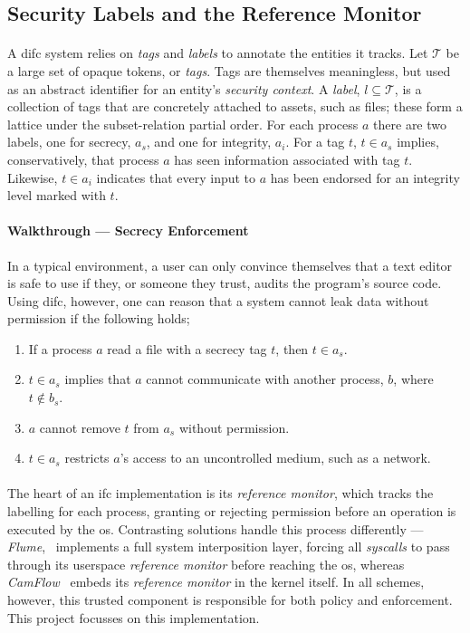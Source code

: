 \subsection{Security Labels and the Reference Monitor}

\paragraph{} A \acrshort{difc} system relies on \textit{tags} and \textit{labels} to annotate the entities it tracks. Let $\mathcal{T}$ be a large set of opaque tokens, or \textit{tags}. Tags are themselves meaningless, but used as an abstract identifier for an entity's \textit{security context}. A \textit{label}, $l \subseteq \mathcal{T}$, is a collection of tags that are concretely attached to assets, such as files; these form a lattice under the subset-relation partial order. For each process $a$ there are two labels, one for secrecy, $a_s$, and one for integrity, $a_i$. For a tag $t$, $t \in a_s$ implies, conservatively, that process $a$ has seen information associated with tag $t$. Likewise, $t \in a_i$ indicates that every input to $a$ has been endorsed for an integrity level marked with $t$.

\paragraph{Walkthrough --- Secrecy Enforcement} In a typical environment, a user can only convince themselves that a text editor is safe to use if they, or someone they trust, audits the program's source code. Using \acrshort{difc}, however, one can reason that a system cannot leak data without permission if the following holds;

\begin{enumerate}
    \item If a process $a$ read a file with a secrecy tag $t$, then $t \in a_s$.
    \item $t \in a_s$ implies that $a$ cannot communicate with another process, $b$, where $t \notin b_s$.
    \item $a$ cannot remove $t$ from $a_s$ without permission.
    \item $t \in a_s$ restricts $a$'s access to an uncontrolled medium, such as a network.
\end{enumerate}

\paragraph{} The heart of an \acrshort{ifc} implementation is its \textit{reference monitor}, which tracks the labelling for each process, granting or rejecting permission before an operation is executed by the \acrshort{os}. Contrasting solutions handle this process differently --- \textit{Flume},~\cite{flume} implements a full system interposition layer, forcing all \textit{syscalls} to pass through its userspace \textit{reference monitor} before reaching the \acrshort{os}, whereas \textit{CamFlow}~\cite{camflow} embeds its \textit{reference monitor} in the kernel itself. In all schemes, however, this trusted component is responsible for both policy and enforcement. This project focusses on this implementation.


